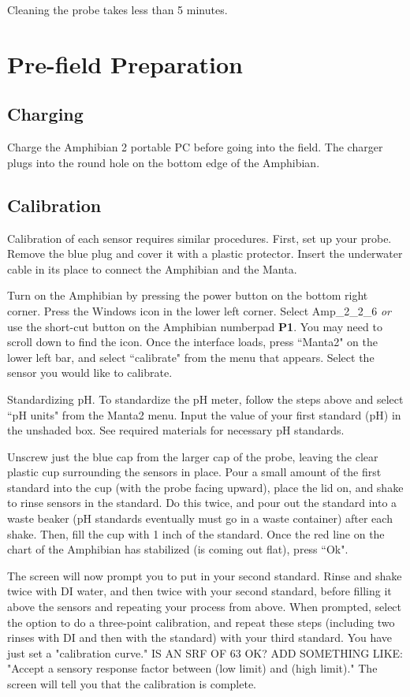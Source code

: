 \documentclass[12pt]{../SOP3}\usepackage[]{graphicx}\usepackage[]{color}
\begin{document}
\NP Cleaning the probe takes less than 5 minutes.

\section{Pre-field Preparation}

\subsection{Charging}

\NP Charge the Amphibian 2 portable PC before going into the field. The charger plugs into the round hole on the bottom edge of the Amphibian. 

\subsection{Calibration}

\NP Calibration of each sensor requires similar procedures. First, set up your probe. Remove the blue plug and cover it with a plastic protector. Insert the underwater cable in its place to connect the Amphibian and the Manta. 

\NP Turn on the Amphibian by pressing the power button on the bottom right corner. Press the Windows icon in the lower left corner. Select Amp\_2\_2\_6 \emph{or} use the short-cut button on the Amphibian numberpad \textbf{P1}. You may need to scroll down to find the icon. Once the interface loads, press ``Manta2" on the lower left bar, and select ``calibrate" from the menu that appears. Select the sensor you would like to calibrate. 

\NP Standardizing pH. To standardize the pH meter, follow the steps above and select ``pH units" from the Manta2 menu. Input the value of your first standard (pH) in the unshaded box. See required materials for necessary pH standards. 

\NP Unscrew just the blue cap from the larger cap of the probe, leaving the clear plastic cup surrounding the sensors in place. Pour a small amount of the first standard into the cup (with the probe facing upward), place the lid on, and shake to rinse sensors in the standard. Do this twice, and pour out the standard into a waste beaker (pH standards eventually must go in a waste container) after each shake. Then, fill the cup with 1 inch of the standard. Once the red line on the chart of the Amphibian has stabilized (is coming out flat), press ``Ok". 

\NP The screen will now prompt you to put in your second standard. Rinse and shake twice with DI water, and then twice with your second standard, before filling it above the sensors and repeating your process from above. When prompted, select the option to do a three-point calibration, and repeat these steps (including two rinses with DI and then with the standard) with your third standard. You have just set a "calibration curve." IS AN SRF OF 63 OK? ADD SOMETHING LIKE: "Accept a sensory response factor between (low limit) and (high limit)." The screen will tell you that the calibration is complete.
\end{document}
